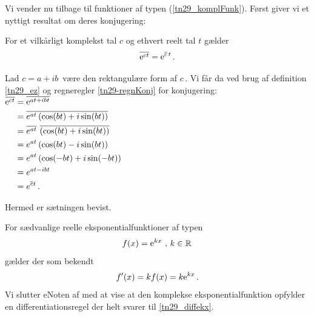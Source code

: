 

Vi vender nu tilbage til funktioner af typen (\ref{tn29_komplFunk}). Først giver vi et nyttigt resultat om deres konjugering:

\begin{theorem}\label{tn29-konj_ect}
For et vilkårligt komplekst tal $c$ og ethvert reelt tal $t$ gælder
\begin{equation}
\overline{\mathrm{e}^{ct}}=\mathrm{e}^{\overline c \,t}\,.
\end{equation}
\end{theorem}

\begin{bevis}
Lad $c=a+ib\,$ være den rektangulære form af $c\,.$ Vi får da ved brug af definition \ref{tn29_ez} og regneregler \ref{tn29-regnKonj} for konjugering:\bs
$
\begin{aligned}
\overline{\mathrm{e}^{ct}}&=\overline{\mathrm{e}^{at+ibt}}\\
&=\overline{e^{at}\left(\cos(bt)+i\sin(bt)\right)}\\
&=\overline{e^{at}}\,\,\overline{\left(\cos(bt)+i\sin(bt)\right)}\\
&=e^{at}\left(\cos(bt)-i\sin(bt)\right)\\
&=e^{at}\left(\cos(-bt)+i\sin(-bt)\right)\\
&=e^{at-ibt}\\
&=e^{\overline{c}t}\,.
\end{aligned}
$\bs

Hermed er sætningen bevist.
\end{bevis}


For sædvanlige reelle eksponentialfunktioner af typen 
$$f(x)=\mathrm{e}^{kx}\,\,,\,k\in\mathbb{R}\,$$
gælder der som bekendt
\begin{equation}\label{tn29_diffekx}
f'(x)=kf(x)=k\mathrm{e}^{kx}\,.
\end{equation}
Vi slutter eNoten af med at vise at den komplekse eksponentialfunktion opfylder en differentiationsregel der helt svarer til \ref{tn29_diffekx}.\bs

